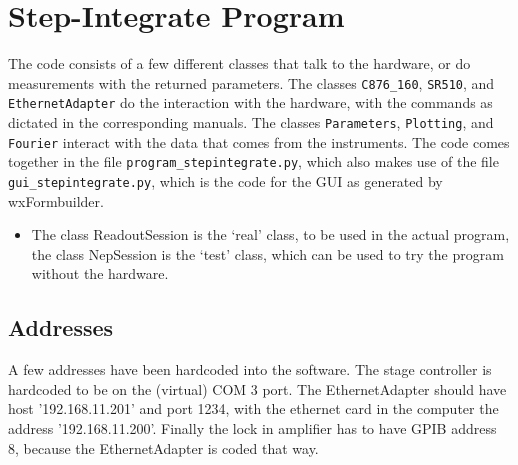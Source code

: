 
\section{Step-Integrate Program}


The code consists of a few different classes that talk to the hardware, or do measurements with the returned parameters. The classes \verb!C876_160!, \verb!SR510!, and \verb!EthernetAdapter! do the interaction with the hardware, with the commands as dictated in the corresponding manuals. The classes \verb!Parameters!, \verb!Plotting!, and \verb!Fourier! interact with the data that comes from the instruments. The code comes together in the file \verb!program_stepintegrate.py!, which also makes use of the file \verb!gui_stepintegrate.py!, which is the code for the GUI as generated by wxFormbuilder.

\begin{itemize}
\item The class ReadoutSession is the `real' class, to be used in the actual program, the class NepSession is the `test' class, which can be used to try the program without the hardware.
\end{itemize}

\subsection{Addresses}
A few addresses have been hardcoded into the software. The stage controller is hardcoded to be on the (virtual) COM 3 port. The EthernetAdapter should have host '192.168.11.201' and port 1234, with the ethernet card in the computer the address '192.168.11.200'. Finally the lock in amplifier has to have GPIB address 8, because the EthernetAdapter is coded that way.

